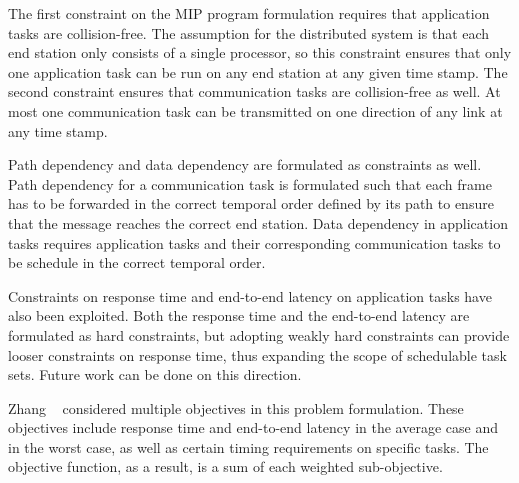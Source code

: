 The first constraint on the MIP program formulation requires that application tasks are collision-free. The assumption for the distributed system is that each end station only consists of a single processor, so this constraint ensures that only one application task can be run on any end station at any given time stamp. The second constraint ensures that communication tasks are collision-free as well. At most one communication task can be transmitted on one direction of any link at any time stamp. 

Path dependency and data dependency are formulated as constraints as well. Path dependency for a communication task is formulated such that each frame has to be forwarded in the correct temporal order defined by its path to ensure that the message reaches the correct end station. Data dependency in application tasks requires application tasks and their corresponding communication tasks to be schedule in the correct temporal order. 

Constraints on response time and end-to-end latency on application tasks have also been exploited. Both the response time and the end-to-end latency are formulated as hard constraints, but adopting weakly hard constraints can provide looser constraints on response time, thus expanding the scope of schedulable task sets. Future work can be done on this direction.

Zhang ~\cite{Zhang2018SynthesizingCA} considered multiple objectives in this problem formulation. These objectives include response time and end-to-end latency in the average case and in the worst case, as well as certain timing requirements on specific tasks. The objective function, as a result, is a sum of each weighted sub-objective.


